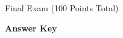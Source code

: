 \documentclass{article}
\begin{document}
\begin{comment}

\vspace*{-3cm}

\begin{flushright}
Name: \hspace*{1in}

\medskip
Student Number: \hspace*{1in}
\end{flushright}

\bigskip

\end{comment}

\begin{center}
\Large Final Exam (100 Points Total) \begin{KEY}\textbf{Answer Key}\end{KEY}
\end{center}
\normalsize
\bigskip
\end{document}
